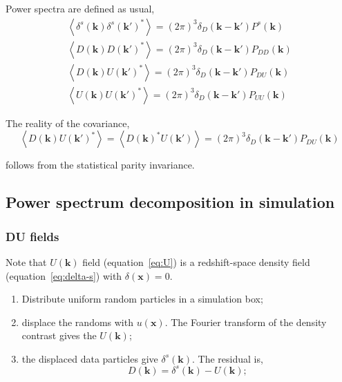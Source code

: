 \documentclass[a4paper,11pt, fleqn]{article}
\begin{document}
\vspace{10mm}
Power spectra are defined as usual,
\begin{align}
  \left\langle \delta^s(\bm{k}) \delta^s(\bm{k}')^* \right\rangle
    = (2\pi)^3 \delta_D(\bm{k} - \bm{k}') P^s(\bm{k})\\
  \left\langle D(\bm{k}) D(\bm{k}')^* \right\rangle
    = (2\pi)^3 \delta_D(\bm{k} - \bm{k}') P_{DD}(\bm{k})\\
  \left\langle D(\bm{k}) U(\bm{k}')^* \right\rangle
    = (2\pi)^3 \delta_D(\bm{k} - \bm{k}') P_{DU}(\bm{k})\\
  \left\langle U(\bm{k}) U(\bm{k}')^* \right\rangle
    = (2\pi)^3 \delta_D(\bm{k} - \bm{k}') P_{UU}(\bm{k})
\end{align}

\vspace{10mm}
The reality of the covariance,
%
\begin{equation}
  \left\langle D(\bm{k}) U(\bm{k}')^* \right\rangle =
  \left\langle D(\bm{k})^* U(\bm{k}') \right\rangle =
  (2\pi)^3 \delta_D(\bm{k} - \bm{k}') P_{DU}(\bm{k})
\end{equation}

follows from the statistical parity invariance. 


\newpage
\subsection{Power spectrum decomposition in simulation}
\subsubsection{DU fields}

Note that $U(\bm{k})$ field (equation~\ref{eq:U}) is a redshift-space
density field (equation~\ref{eq:delta-s}) with $\delta(\bm{x}) = 0$.
%
\begin{enumerate}
  \item Distribute uniform random particles in a simulation box;
  \item displace the randoms with $u(\bm{x})$. The Fourier transform
    of the density contrast gives the $U(\bm{k})$;
  \item the displaced data particles give $\delta^s(\bm{k})$. The
    residual is,
    \begin{equation}
      D(\bm{k}) = \delta^s(\bm{k}) - U(\bm{k});
    \end{equation}
\end{enumerate}
\end{document}
